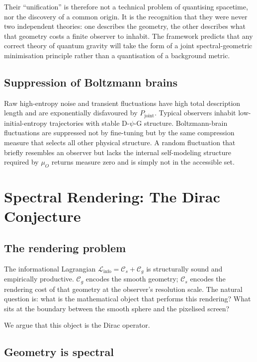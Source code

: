 \documentclass[12pt,a4paper]{article}
\newcommand{\Linfo}{\mathcal{L}_{\mathrm{info}}}
\newcommand{\Cs}{\mathcal{C}_s}
\newcommand{\Cg}{\mathcal{C}_g}
\newcommand{\Pjoint}{P_{\mathrm{joint}}}
\newcommand{\muO}{\mu_O}
\begin{document}
Their ``unification'' is therefore not a technical problem of quantising
spacetime, nor the discovery of a common origin. It is the recognition that
they were never two independent theories: one describes the geometry, the other
describes what that geometry costs a finite observer to inhabit. The framework
predicts that any correct theory of quantum gravity will take the form of a
joint spectral-geometric minimisation principle rather than a quantisation of a
background metric.

\subsection*{Suppression of Boltzmann brains}

Raw high-entropy noise and transient fluctuations have high total description
length and are exponentially disfavoured by $\Pjoint$. Typical observers
inhabit low-initial-entropy trajectories with stable D-$\psi$-G structure.
Boltzmann-brain fluctuations are suppressed not by fine-tuning but by the
same compression measure that selects all other physical structure. A random
fluctuation that briefly resembles an observer but lacks the internal
self-modeling structure required by $\muO$ returns measure zero and is simply
not in the accessible set.

\section{Spectral Rendering: The Dirac Conjecture}
\label{sec:dirac}

\subsection*{The rendering problem}

The informational Lagrangian $\Linfo = \Cs + \Cg$ is structurally sound and
empirically productive. $\Cg$ encodes the smooth geometry; $\Cs$ encodes the
rendering cost of that geometry at the observer's resolution scale. The natural
question is: what is the mathematical object that performs this rendering?
What sits at the boundary between the smooth sphere and the pixelised screen?

We argue that this object is the Dirac operator.



\subsection*{Geometry is spectral}
\end{document}
